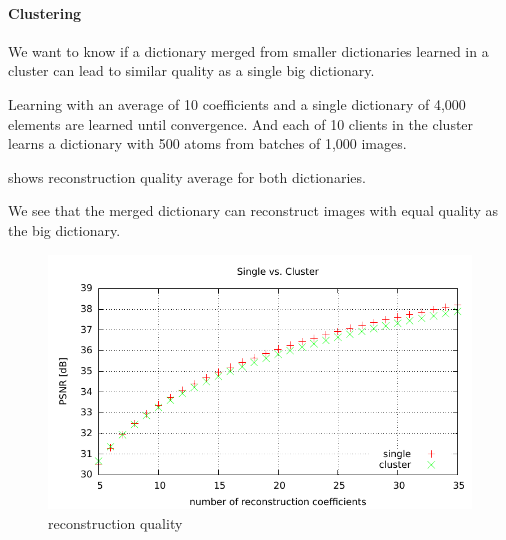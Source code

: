 


\paragraph{Clustering}
We want to know if a dictionary merged from smaller dictionaries learned in a
cluster can lead to similar quality as a single big dictionary.

Learning with an average of 10 coefficients and a single dictionary of 4,000
elements are learned until convergence. And each of 10 clients in the cluster
learns a dictionary with 500 atoms from batches of 1,000 images. 

 shows reconstruction quality average for both
dictionaries.

We see that the merged dictionary can reconstruct images with equal quality
as the big dictionary. 



\begin{figure}[H]
\centering
\includegraphics[width = 1.0\textwidth]{../tests/results/coeffsConvergInc.pdf}
\caption{reconstruction quality}
\label{fig:coeffsConvergInc}
\end{figure}


